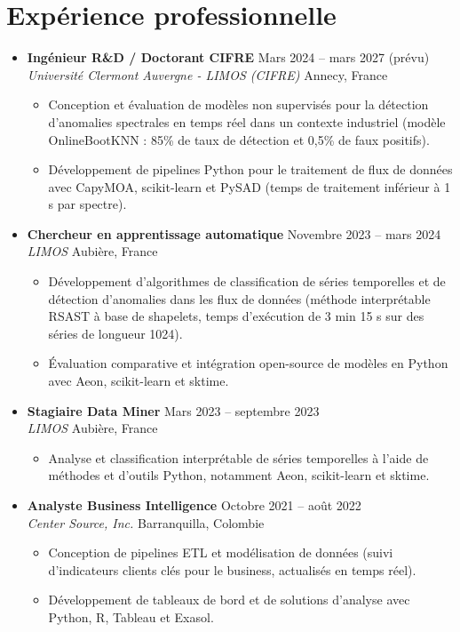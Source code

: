 \documentclass[12pt,a4paper]{article}
\begin{document}
\section*{Expérience professionnelle}
\begin{itemize}
\item \textbf{Ingénieur R\&D / Doctorant CIFRE} \hfill Mars 2024 -- mars 2027 (prévu)\\
\textit{Université Clermont Auvergne - LIMOS (CIFRE)} \hfill Annecy, France
\begin{itemize}
\item Conception et évaluation de modèles non supervisés pour la détection d'anomalies spectrales en temps réel dans un contexte industriel (modèle OnlineBootKNN : 85\% de taux de détection et 0,5\% de faux positifs).
\item Développement de pipelines Python pour le traitement de flux de données avec CapyMOA, scikit-learn et PySAD (temps de traitement inférieur à 1 s par spectre).
\end{itemize}

\item \textbf{Chercheur en apprentissage automatique} \hfill Novembre 2023 -- mars 2024\\
\textit{LIMOS} \hfill Aubière, France
\begin{itemize}
\item Développement d'algorithmes de classification de séries temporelles et de détection d'anomalies dans les flux de données (méthode interprétable RSAST à base de shapelets, temps d'exécution de 3 min 15 s sur des séries de longueur 1024).
\item Évaluation comparative et intégration open-source de modèles en Python avec Aeon, scikit-learn et sktime.
\end{itemize}

\item \textbf{Stagiaire Data Miner} \hfill Mars 2023 -- septembre 2023\\
\textit{LIMOS} \hfill Aubière, France
\begin{itemize}
\item Analyse et classification interprétable de séries temporelles à l'aide de méthodes et d'outils Python, notamment Aeon, scikit-learn et sktime.
\end{itemize}

\item \textbf{Analyste Business Intelligence} \hfill Octobre 2021 -- août 2022\\
\textit{Center Source, Inc.} \hfill Barranquilla, Colombie
\begin{itemize}
\item Conception de pipelines ETL et modélisation de données (suivi d'indicateurs clients clés pour le business, actualisés en temps réel).
\item Développement de tableaux de bord et de solutions d'analyse avec Python, R, Tableau et Exasol.
\end{itemize}


\end{itemize}
\end{document}
